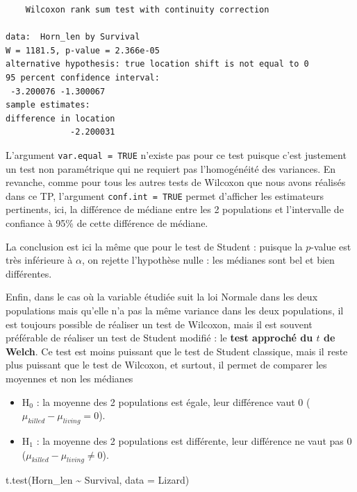 \documentclass[
  a4paper,
]{article}
\newenvironment{Shaded}{\begin{snugshade}}{\end{snugshade}}
\newcommand{\AttributeTok}[1]{\textcolor[rgb]{0.00,0.34,0.68}{#1}}
\newcommand{\FunctionTok}[1]{\textcolor[rgb]{0.39,0.29,0.61}{#1}}
\newcommand{\NormalTok}[1]{\textcolor[rgb]{0.12,0.11,0.11}{#1}}
\newcommand{\SpecialCharTok}[1]{\textcolor[rgb]{0.24,0.68,0.91}{#1}}
\providecommand{\tightlist}{%
  \setlength{\itemsep}{0pt}\setlength{\parskip}{0pt}}
\begin{document}
\begin{verbatim}
    Wilcoxon rank sum test with continuity correction

data:  Horn_len by Survival
W = 1181.5, p-value = 2.366e-05
alternative hypothesis: true location shift is not equal to 0
95 percent confidence interval:
 -3.200076 -1.300067
sample estimates:
difference in location 
             -2.200031 
\end{verbatim}

L'argument \texttt{var.equal\ =\ TRUE} n'existe pas pour ce test puisque c'est justement un test non paramétrique qui ne requiert pas l'homogénéité des variances. En revanche, comme pour tous les autres tests de Wilcoxon que nous avons réalisés dans ce TP, l'argument \texttt{conf.int\ =\ TRUE} permet d'afficher les estimateurs pertinents, ici, la différence de médiane entre les 2 populations et l'intervalle de confiance à 95\% de cette différence de médiane.

La conclusion est ici la même que pour le test de Student : puisque la \(p\)-value est très inférieure à \(\alpha\), on rejette l'hypothèse nulle : les médianes sont bel et bien différentes.

Enfin, dans le cas où la variable étudiée suit la loi Normale dans les deux populations mais qu'elle n'a pas la même variance dans les deux populations, il est toujours possible de réaliser un test de Wilcoxon, mais il est souvent préférable de réaliser un test de Student modifié : le \textbf{test approché du \(t\) de Welch}. Ce test est moins puissant que le test de Student classique, mais il reste plus puissant que le test de Wilcoxon, et surtout, il permet de comparer les moyennes et non les médianes

\begin{itemize}
\tightlist
\item
  H\(_0\) : la moyenne des 2 populations est égale, leur différence vaut 0 (\(\mu_{killed}-\mu_{living} = 0\)).
\item
  H\(_1\) : la moyenne des 2 populations est différente, leur différence ne vaut pas 0 (\(\mu_{killed}-\mu_{living} \neq 0\)).
\end{itemize}

\begin{Shaded}
\begin{Highlighting}[]
\FunctionTok{t.test}\NormalTok{(Horn\_len }\SpecialCharTok{\textasciitilde{}}\NormalTok{ Survival, }\AttributeTok{data =}\NormalTok{ Lizard)}
\end{Highlighting}
\end{Shaded}
\end{document}
